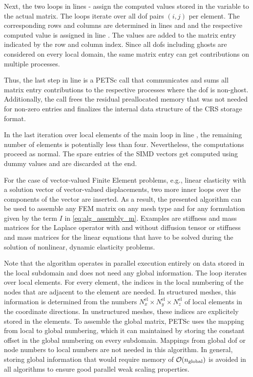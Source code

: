 Next, the two loops in lines  -   assign the computed values stored in the variable  to the actual matrix. The loops iterate over all dof pairs $(i,j)$ per element. The corresponding rows and columns are determined in lines  and  and the respective computed value is assigned in line . 
The values are added to the matrix entry indicated by the row and column index. Since all dofs including ghosts are considered on every local domain, the same matrix entry can get contributions on multiple processes.

Thus, the last step in line  is a PETSc call that communicates and sums all matrix entry contributions to the respective processes where the dof is non-ghost. Additionally, the call frees the residual preallocated memory that was not needed for non-zero entries and finalizes the internal data structure of the CRS storage format.

In the last iteration over local elements of the main loop in line , the remaining number of elements is potentially less than four. Nevertheless, the computations proceed as normal. The spare entries of the SIMD vectors get computed using dummy values and are discarded at the end.

For the case of vector-valued Finite Element problems, e.g., linear elasticity with a solution vector of vector-valued displacements, two more inner loops over the components of the vector are inserted. As a result, the presented algorithm can be used to assemble any FEM matrix on any mesh type and for any formulation given by the term $I$ in \cref{eq:alg_assembly_m}.
Examples are stiffness and mass matrices for the Laplace operator with and without diffusion tensor or stiffness and mass matrices for the linear equations that have to be solved during the solution of nonlinear, dynamic elasticity problems.

Note that the algorithm operates in parallel execution entirely on data stored in the local subdomain and does not need any global information. The loop iterates over local elements. For every element, the indices in the local numbering of the nodes that are adjacent to the element are needed. In structured meshes, this information is determined from the numbers $N^\text{el}_x \times N^\text{el}_y \times N^\text{el}_z$ of local elements in the coordinate directions. In unstructured meshes, these indices are explicitely stored in the elements. To assemble the global matrix, PETSc uses the mapping from local to global numbering, which it can maintained by storing the constant offset in the global numbering on every subdomain. Mappings from global dof or node numbers to local numbers are not needed in this algorithm. 
In general, storing global information that would require memory of $\mathcal{O}(n_\text{global})$ is avoided in all algorithms to ensure good parallel weak scaling properties.

